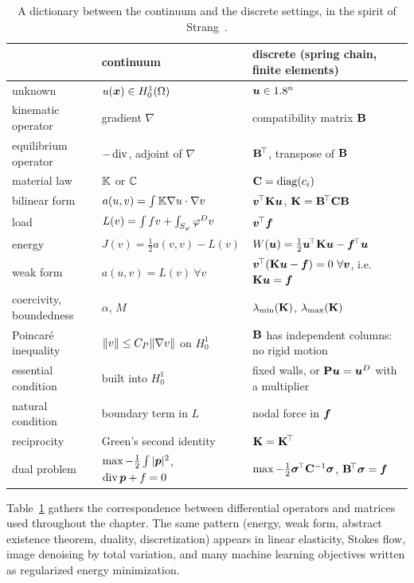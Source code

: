\begin{table}[h]
\centering\small
\renewcommand{\arraystretch}{1.2}
\begin{tabular}{lll}
\toprule
 & \sffamily continuum & \sffamily discrete (spring chain, finite elements)\\
\midrule
unknown & $u(\bm{x})\in H^1_0(\Omega)$ & $\bm{u}\in1.8^n$\\
kinematic operator & gradient $\nabla$ & compatibility matrix $\mathbf{B}$\\
equilibrium operator & $-\operatorname{div}$, adjoint of $\nabla$ & $\mathbf{B}^{\!\top}$, transpose of $\mathbf{B}$\\
material law & $\mathbb{K}$ or $\mathbb{C}$ & $\mathbf{C}=\operatorname{diag}(c_i)$\\
bilinear form & $a(u,v)=\int\mathbb{K}\nabla u\cdot\nabla v$ & $\bm{v}^{\!\top}\mathbf{K}\bm{u}$, $\mathbf{K}=\mathbf{B}^{\!\top}\mathbf{C}\mathbf{B}$\\
load & $L(v)=\int fv+\int_{S_\varphi}\varphi^{D} v$ & $\bm{v}^{\!\top}\bm{f}$\\
energy & $J(v)=\tfrac12a(v,v)-L(v)$ & $W(\bm{u})=\tfrac12\bm{u}^{\!\top}\mathbf{K}\bm{u}-\bm{f}^{\!\top}\bm{u}$\\
weak form & $a(u,v)=L(v)\ \forall v$ & $\bm{v}^{\!\top}(\mathbf{K}\bm{u}-\bm{f})=0\ \forall\bm{v}$, i.e.\ $\mathbf{K}\bm{u}=\bm{f}$\\
coercivity, boundedness & $\alpha$, $M$ & $\lambda_{\min}(\mathbf{K})$, $\lambda_{\max}(\mathbf{K})$\\
Poincar\'e inequality & $\lVert v\rVert\le C_P\lVert \nabla v\rVert$ on $H^1_0$ & $\mathbf{B}$ has independent columns: no rigid motion\\
essential condition & built into $H^1_0$ & fixed walls, or $\mathbf{P}\bm{u}=\bm{u}^{D}$ with a multiplier\\
natural condition & boundary term in $L$ & nodal force in $\bm{f}$\\
reciprocity & Green's second identity & $\mathbf{K}=\mathbf{K}^{\!\top}$\\
dual problem & $\max-\tfrac12\int|\bm{p}|^2$, $\operatorname{div}\bm{p}+f=0$ & $\max-\tfrac12\bm{\sigma}^{\!\top}\mathbf{C}^{-1}\bm{\sigma}$, $\mathbf{B}^{\!\top}\bm{\sigma}=\bm{f}$\\
\bottomrule
\end{tabular}
\caption{A dictionary between the continuum and the discrete settings, in the
spirit of Strang~\cite{Strang1986}.}
\label{tab:dictionary}
\end{table}
Table~\ref{tab:dictionary} gathers the correspondence between differential
operators and matrices used throughout the chapter.
The same pattern (energy, weak form, abstract existence theorem, duality,
discretization) appears in linear elasticity, Stokes flow, image denoising by
total variation, and many machine learning objectives written as regularized
energy minimization.

